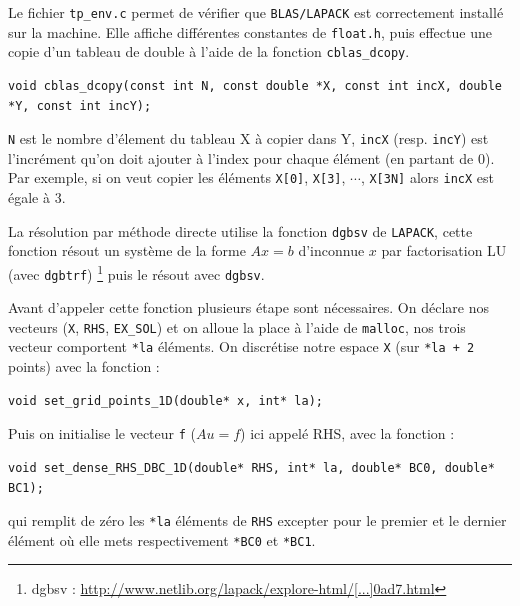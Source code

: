 \documentclass{article}
\begin{document}
Le fichier \texttt{tp\_env.c} permet de vérifier que \texttt{BLAS/LAPACK} est correctement installé sur la machine. Elle affiche différentes constantes de \texttt{float.h}, puis effectue une copie d'un tableau de double à l'aide de la fonction \texttt{cblas\_dcopy}.
\begin{scriptsize}
\begin{verbatim}
void cblas_dcopy(const int N, const double *X, const int incX, double *Y, const int incY);
\end{verbatim}
\end{scriptsize}
\texttt{N} est le nombre d'élement du tableau X à copier dans Y, \texttt{incX} (resp. \texttt{incY}) est l'incrément qu'on doit ajouter à l'index pour chaque élément (en partant de 0). Par exemple, si on veut copier les éléments \texttt{X[0]}, \texttt{X[3]}, $\cdots$, \texttt{X[3N]} alors \texttt{incX} est égale à $3$.

La résolution par méthode directe utilise la fonction \texttt{dgbsv} de \texttt{LAPACK}, cette fonction résout un système de la forme $Ax = b$ d'inconnue $x$ par factorisation LU (avec \texttt{dgbtrf}) \footnote{dgbsv : \href{http://www.netlib.org/lapack/explore-html/d3/d49/group__double_g_bsolve_gafa35ce1d7865b80563bbed6317050ad7.html}{http://www.netlib.org/lapack/explore-html/[...]0ad7.html}} puis le résout avec \texttt{dgbsv}.

Avant d'appeler cette fonction plusieurs étape sont nécessaires. On déclare nos vecteurs (\texttt{X}, \texttt{RHS}, \texttt{EX\_SOL}) et on alloue la place à l'aide de \texttt{malloc}, nos trois vecteur comportent \texttt{*la} éléments. On discrétise notre espace \texttt{X} (sur \texttt{*la + 2} points) avec la fonction :
\begin{scriptsize}
\begin{verbatim}
void set_grid_points_1D(double* x, int* la);
\end{verbatim}
\end{scriptsize}
Puis on initialise le vecteur \texttt{f} ($Au = f$) ici appelé RHS, avec la fonction : \begin{scriptsize}
\begin{verbatim}
void set_dense_RHS_DBC_1D(double* RHS, int* la, double* BC0, double* BC1);
\end{verbatim}
\end{scriptsize}
qui remplit de zéro les \texttt{*la} éléments de \texttt{RHS} excepter pour le premier et le dernier élément où elle mets respectivement \texttt{*BC0} et \texttt{*BC1}.
\end{document}
